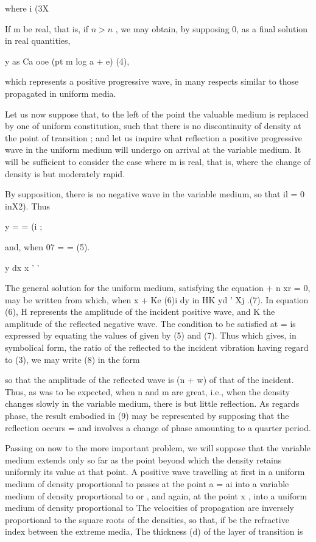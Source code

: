where i (3X

If m be real, that is, if \(n > n\) , we may obtain, by supposing 0, as
a final solution in real quantities,

y as Ca ooe (pt m log a + e) (4),

which represents a positive progressive wave, in many respects similar
to those propagated in uniform media.

Let us now suppose that, to the left of the point the
valuable medium is replaced by one of uniform constitution, such that
there is no discontinuity of density at the point of transition ; and
let us inquire what reflection a positive progressive wave in the
uniform medium will undergo on arrival at the variable medium. It will
be sufficient to consider the case where m is real, that is, where the
change of density is but moderately rapid.

By supposition, there is no negative wave in the variable medium, so
that il = 0 inX2). Thus

y = = (i ;

and, when 07 = = (5).

y dx x ' '

The general solution for the uniform medium, satisfying the equation + n
xr = 0, may be written from which, when x + Ke (6)i dy in HK yd ' Xj
.(7). In equation (6), H represents the amplitude of the incident
positive wave, and K the amplitude of the reflected negative wave. The
condition to be satisfied at = is expressed by
equating the values of given by (5) and (7). Thus
which gives, in symbolical form, the ratio of the reflected to the
incident vibration having regard to (3), we may write (8) in the form

so that the amplitude of the reflected wave is (n + w) of that of the
incident. Thus, as was to be expected, when n and m are great, i.e.,
when the density changes slowly in the variable
medium, there is but little reflection. As regards phase, the result
embodied in (9) may be represented by supposing that the reflection
occurs = and involves a change of phase amounting to a quarter period.

Passing on now to the more important problem, we will suppose that the
variable medium extends only so far as the point beyond which the
density retains uniformly its value at that point. A positive wave
travelling at first in a uniform medium of density proportional to
passes at the point a = ai into a variable medium of density
proportional to or , and again, at the point x , into a uniform medium
of density proportional to The velocities of propagation are inversely
proportional to the square roots of the densities, so that, if be the
refractive index between the extreme media, The thickness (d) of the
layer of transition is

